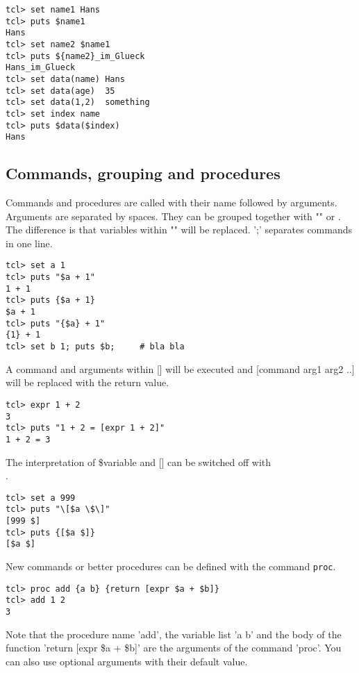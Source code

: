 \begin{verbatim}
tcl> set name1 Hans
tcl> puts $name1
Hans
tcl> set name2 $name1
tcl> puts ${name2}_im_Glueck
Hans_im_Glueck
tcl> set data(name) Hans
tcl> set data(age)  35
tcl> set data(1,2)  something
tcl> set index name
tcl> puts $data($index)
Hans
\end{verbatim}


\subsection*{Commands, grouping and procedures}
 
Commands and procedures are called with their name followed by
arguments. Arguments are separated by spaces. They can be grouped
together with "" or {}. The difference is that variables within "" will
be replaced. ';' separates commands in one line.

\begin{verbatim}
tcl> set a 1
tcl> puts "$a + 1"
1 + 1
tcl> puts {$a + 1}
$a + 1
tcl> puts "{$a} + 1"
{1} + 1
tcl> set b 1; puts $b;     # bla bla
\end{verbatim}

A command and arguments within [] will be executed and [command arg1
arg2 ..] will be replaced with the return value.

\begin{verbatim}
tcl> expr 1 + 2
3
tcl> puts "1 + 2 = [expr 1 + 2]"
1 + 2 = 3
\end{verbatim}


The interpretation of \$variable and [] can be switched off with \\.

\begin{verbatim}
tcl> set a 999
tcl> puts "\[$a \$\]"
[999 $]
tcl> puts {[$a $]}
[$a $]
\end{verbatim}

New  commands or better   procedures can be   defined with the command
\texttt{proc}.

\begin{verbatim}
tcl> proc add {a b} {return [expr $a + $b]}
tcl> add 1 2
3
\end{verbatim}

Note that the procedure name 'add', the variable list '{a b}' and the
body of the function '{return [expr \$a + \$b]}' are the arguments of the
command 'proc'. You can also use optional arguments with their default
value.

